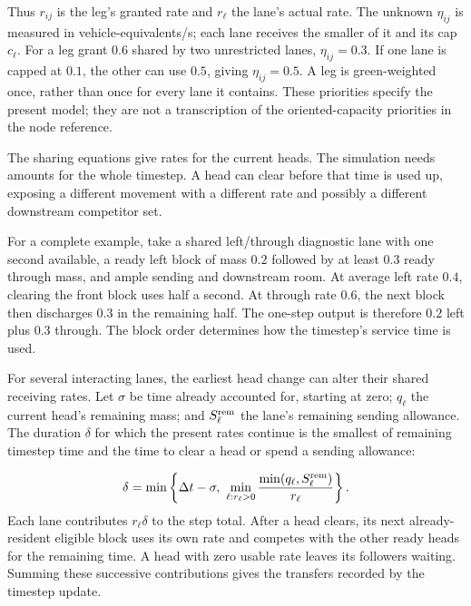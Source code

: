 \documentclass[10pt,a4paper]{article}
\newenvironment{revision}{\begingroup\color{revisionred}}{\par\endgroup}
\begin{document}
\begin{revision}
Thus $r_{ij}$ is the leg's granted rate and $r_\ell$ the lane's actual
rate. The unknown $\eta_{ij}$ is measured in vehicle-equivalents/s; each
lane receives the smaller of it and its cap $c_\ell$. For a leg grant
$0.6$ shared by two unrestricted lanes, $\eta_{ij}=0.3$. If one lane is
capped at $0.1$, the other can use $0.5$, giving $\eta_{ij}=0.5$.
A leg is green-weighted once, rather than once for every lane it contains.
These priorities specify the present model; they are not a transcription
of the oriented-capacity priorities in the node reference.

The sharing equations give rates for the current heads. The simulation
needs amounts for the whole timestep. A head can clear before that time
is used up, exposing a different movement with a different rate and
possibly a different downstream competitor set.

For a complete example, take a shared left/through diagnostic lane with
one second available, a ready left block of mass $0.2$ followed by at
least $0.3$ ready through mass, and ample sending and downstream room.
At average left rate $0.4$, clearing the front block uses half a second.
At through rate $0.6$, the next block then discharges $0.3$ in the remaining
half. The one-step output is therefore $0.2$ left plus $0.3$ through.
The block order determines how the timestep's service time is used.

For several interacting lanes, the earliest head change can alter their
shared receiving rates. Let $\sigma$ be time already accounted for, starting
at zero; $q_\ell$ the current head's remaining mass; and
$S_\ell^{\rm rem}$ the lane's remaining sending allowance. The duration
$\delta$ for which the present rates continue is the smallest of remaining
timestep time and the time to clear a head or spend a sending allowance:
\end{revision}
\begin{equation}
 \delta=\min\left\{\Delta t-\sigma,\
 \min_{\ell:r_\ell>0}
       \frac{\min(q_\ell,S_\ell^{\rm rem})}{r_\ell}\right\}.
 \label{eq:compact-head-time}
\end{equation}
\begin{revision}
Each lane contributes $r_\ell\delta$ to the step total. After a head clears,
its next already-resident eligible block uses its own rate and competes
with the other ready heads for the remaining time. A head with zero
usable rate leaves its followers waiting. Summing these successive
contributions gives the transfers recorded by the timestep update.
\end{revision}
\end{document}

